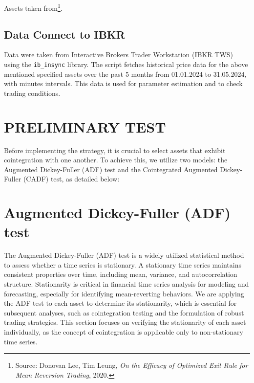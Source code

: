 \documentclass{article}
\begin{document}
Assets taken from\footnote{Source: Donovan Lee, Tim Leung, \textit{On the Efficacy of Optimized Exit Rule for Mean Reversion Trading}, 2020.}.

\subsection*{Data Connect to IBKR}
Data were taken from Interactive Brokers Trader Workstation (IBKR TWS) using the \texttt{ib\_insync} library.
The script fetches historical price data for the above mentioned specified assets over the past 5 months from 01.01.2024 to 31.05.2024, with minutes intervals. This data is used for parameter estimation and to check trading conditions.
\clearpage










\section{PRELIMINARY TEST}
Before implementing the strategy, it is crucial to select assets that exhibit cointegration with one another. To achieve this, we utilize two models: the Augmented Dickey-Fuller (ADF) test and the Cointegrated Augmented Dickey-Fuller (CADF) test, as detailed below:

\section*{Augmented Dickey-Fuller (ADF) test}
The Augmented Dickey-Fuller (ADF) test is a widely utilized statistical method to assess whether a time series is stationary. A stationary time series maintains consistent properties over time, including mean, variance, and autocorrelation structure. Stationarity is critical in financial time series analysis for modeling and forecasting, especially for identifying mean-reverting behaviors.
We are applying the ADF test to each asset to determine its stationarity, which is essential for subsequent analyses, such as cointegration testing and the formulation of robust trading strategies. This section focuses on verifying the stationarity of each asset individually, as the concept of cointegration is applicable only to non-stationary time series.
\end{document}
